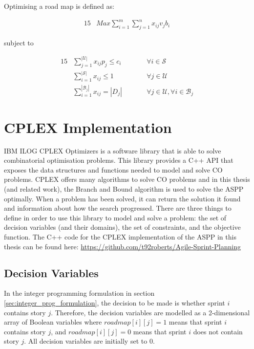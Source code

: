 Optimising a road map is defined as:

\begin{alignat}{15}    
    & Max \sum_{i=1}^{m} \sum_{j=1}^{n} x_{ij} v_j b_i \label{eq:objective}
\end{alignat}
\normalsize

subject to

\begin{alignat}{15}    
    & \sum_{j=1}^{|\mathcal{U}|} x_{ij} p_j \leq c_i                \quad \quad && \forall i \in \mathcal{S}    \label{eq:constr1}\\ %
    & \sum_{i=1}^{|\mathcal{S}|} x_{ij} \leq 1                      \quad \quad && \forall j \in \mathcal{U}    \label{eq:constr2}\\ %
    & \sum_{i=1}^{|\mathcal{B}_j|} x_{ij} = |D_j|   \quad \quad && \forall j \in \mathcal{U}, \forall i \in \mathcal{B}_j \label{eq:constr3} %
\end{alignat}
\normalsize

\section{CPLEX Implementation}
\label{sec:cplex_implementation}

IBM ILOG CPLEX Optimizers \citep{ibm_corporation_2018} is a software library that is able to solve combinatorial optimisation problems. This library provides a C++ API that exposes the data structures and functions needed to model and solve CO problems. CPLEX offers many algorithms to solve CO problems and in this thesis (and related work), the Branch and Bound algorithm is used to solve the ASPP optimally. When a problem has been solved, it can return the solution it found and information about how the search progressed. There are three things to define in order to use this library to model and solve a problem: the set of decision variables (and their domains), the set of constraints, and the objective function. The C++ code for the CPLEX implementation of the ASPP in this thesis can be found here: \url{https://github.com/t92roberts/Agile-Sprint-Planning}

\subsection{Decision Variables}
In the integer programming formulation in section \ref{sec:integer_prog_formulation}, the decision to be made is whether sprint $i$ contains story $j$. Therefore, the decision variables are modelled as a 2-dimensional array of Boolean variables where $roadmap[i][j] = 1$ means that sprint $i$ contains story $j$, and $roadmap[i][j] = 0$ means that sprint $i$ does not contain story $j$. All decision variables are initially set to $0$.

